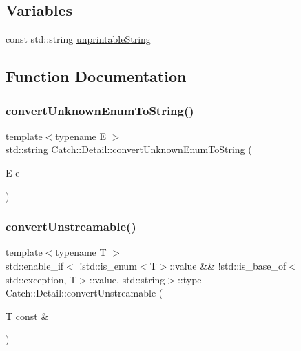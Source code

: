 \subsection*{Variables}
\begin{DoxyCompactItemize}
\item 
const std\+::string \mbox{\hyperlink{namespace_catch_1_1_detail_a466775f4eec29ffef29ab334cd885136}{unprintable\+String}}
\end{DoxyCompactItemize}


\subsection{Function Documentation}
\mbox{\label{namespace_catch_1_1_detail_a242396de537c5176710d680cc9ca6b93}} 
\subsubsection{\texorpdfstring{convertUnknownEnumToString()}{convertUnknownEnumToString()}}
{\footnotesize\ttfamily template$<$typename E $>$ \\
std\+::string Catch\+::\+Detail\+::convert\+Unknown\+Enum\+To\+String (\begin{DoxyParamCaption}\item[{E}]{e }\end{DoxyParamCaption})}

\mbox{\label{namespace_catch_1_1_detail_a8e765acd7fc9eabdc34c786014cf02cd}} 
\subsubsection{\texorpdfstring{convertUnstreamable()}{convertUnstreamable()}\hspace{0.1cm}{\footnotesize\ttfamily [1/3]}}
{\footnotesize\ttfamily template$<$typename T $>$ \\
std\+::enable\+\_\+if$<$ !std\+::is\+\_\+enum$<$T$>$\+::value \&\& !std\+::is\+\_\+base\+\_\+of$<$std\+::exception, T$>$\+::value, std\+::string$>$\+::type Catch\+::\+Detail\+::convert\+Unstreamable (\begin{DoxyParamCaption}\item[{T const \&}]{ }\end{DoxyParamCaption})}

